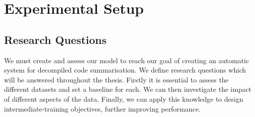 \chapter{Experimental Setup}
\label{ExperimentalSetup}


\section{Research Questions}
We must create and assess our model to reach our goal of creating an automatic system for decompiled code summarisation. We define research questions which will be answered throughout the thesis. Firstly it is essential to assess the different datasets and set a baseline for each. We can then investigate the impact of different aspects of the data. Finally, we can apply this knowledge to design intermediate-training objectives, further improving performance.

